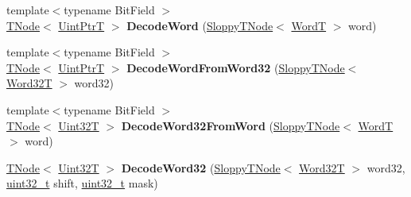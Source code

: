 \begin{DoxyCompactItemize}
\item 
\mbox{\label{classv8_1_1internal_1_1CodeStubAssembler_ada1610c9452a726beb1e267a15ba8ec3}} 
{\footnotesize template$<$typename Bit\+Field $>$ }\\\mbox{\hyperlink{classv8_1_1internal_1_1compiler_1_1TNode}{T\+Node}}$<$ \mbox{\hyperlink{structv8_1_1internal_1_1UintPtrT}{Uint\+PtrT}} $>$ {\bfseries Decode\+Word} (\mbox{\hyperlink{classv8_1_1internal_1_1compiler_1_1SloppyTNode}{Sloppy\+T\+Node}}$<$ \mbox{\hyperlink{structv8_1_1internal_1_1WordT}{WordT}} $>$ word)
\item 
\mbox{\label{classv8_1_1internal_1_1CodeStubAssembler_ac2dbb8f228a0ab925806cd31a8b80ea0}} 
{\footnotesize template$<$typename Bit\+Field $>$ }\\\mbox{\hyperlink{classv8_1_1internal_1_1compiler_1_1TNode}{T\+Node}}$<$ \mbox{\hyperlink{structv8_1_1internal_1_1UintPtrT}{Uint\+PtrT}} $>$ {\bfseries Decode\+Word\+From\+Word32} (\mbox{\hyperlink{classv8_1_1internal_1_1compiler_1_1SloppyTNode}{Sloppy\+T\+Node}}$<$ \mbox{\hyperlink{structv8_1_1internal_1_1Word32T}{Word32T}} $>$ word32)
\item 
\mbox{\label{classv8_1_1internal_1_1CodeStubAssembler_ae20e882efcbc3420bed2e800ccd237ff}} 
{\footnotesize template$<$typename Bit\+Field $>$ }\\\mbox{\hyperlink{classv8_1_1internal_1_1compiler_1_1TNode}{T\+Node}}$<$ \mbox{\hyperlink{structv8_1_1internal_1_1Uint32T}{Uint32T}} $>$ {\bfseries Decode\+Word32\+From\+Word} (\mbox{\hyperlink{classv8_1_1internal_1_1compiler_1_1SloppyTNode}{Sloppy\+T\+Node}}$<$ \mbox{\hyperlink{structv8_1_1internal_1_1WordT}{WordT}} $>$ word)
\item 
\mbox{\label{classv8_1_1internal_1_1CodeStubAssembler_aa798cedac387175de75827b32a7c67f1}} 
\mbox{\hyperlink{classv8_1_1internal_1_1compiler_1_1TNode}{T\+Node}}$<$ \mbox{\hyperlink{structv8_1_1internal_1_1Uint32T}{Uint32T}} $>$ {\bfseries Decode\+Word32} (\mbox{\hyperlink{classv8_1_1internal_1_1compiler_1_1SloppyTNode}{Sloppy\+T\+Node}}$<$ \mbox{\hyperlink{structv8_1_1internal_1_1Word32T}{Word32T}} $>$ word32, \mbox{\hyperlink{classuint32__t}{uint32\+\_\+t}} shift, \mbox{\hyperlink{classuint32__t}{uint32\+\_\+t}} mask)

\end{DoxyCompactItemize}
